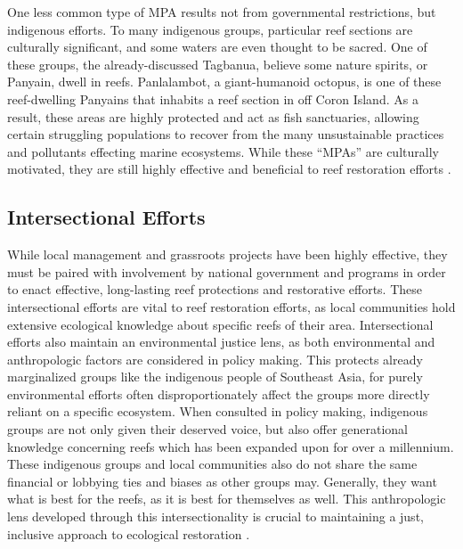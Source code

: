 \documentclass{book}\usepackage{knitr}
\begin{document}
One less common type of MPA results not from governmental restrictions, but indigenous efforts. To many indigenous groups, particular reef sections are culturally significant, and some waters are even thought to be sacred. One of these groups, the already-discussed Tagbanua, believe some nature spirits, or Panyain, dwell in reefs. Panlalambot, a giant-humanoid octopus, is one of these reef-dwelling Panyains that inhabits a reef section in off Coron Island. As a result, these areas are highly protected and act as fish sanctuaries, allowing certain struggling populations to recover from the many unsustainable practices and pollutants effecting marine ecosystems. While these ``MPAs'' are culturally motivated, they are still highly effective and beneficial to reef restoration efforts \citep{4826000120100501}.

\subsection{Intersectional Efforts} \label{sub:ie}

While local management and grassroots projects have been highly effective, they must be paired with involvement by national government and programs in order to enact effective, long-lasting reef protections and restorative efforts. These intersectional efforts are vital to reef restoration efforts, as local communities hold extensive ecological knowledge about specific reefs of their area. Intersectional efforts also maintain an environmental justice lens, as both environmental and anthropologic factors are considered in policy making. This protects already marginalized groups like the indigenous people of Southeast Asia, for purely environmental efforts often disproportionately affect the groups more directly reliant on a specific ecosystem. When consulted in policy making, indigenous groups are not only given their deserved voice, but also offer generational knowledge concerning reefs which has been expanded upon for over a millennium. These indigenous groups and local communities also do not share the same financial or lobbying ties and biases as other groups may. Generally, they want what is best for the reefs, as it is best for themselves as well. This anthropologic lens developed through this intersectionality is crucial to maintaining a just, inclusive approach to ecological restoration \citep{13772149520190801}.
\end{document}
